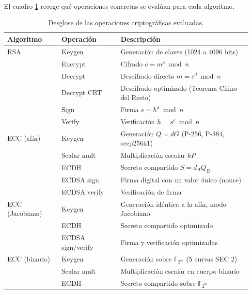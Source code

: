 El cuadro \ref{tab:operaciones} recoge qué operaciones concretas se evalúan para cada algoritmo.

\begin{table}[htbp]
\centering
\small
\begin{tabular}{llp{6.5cm}}
\hline
\textbf{Algoritmo} & \textbf{Operación} & \textbf{Descripción} \\
\hline
RSA              & Keygen           & Generación de claves (1024 a 4096 bits) \\
                 & Encrypt          & Cifrado $c = m^e \bmod n$ \\
                 & Decrypt          & Descifrado directo $m = c^d \bmod n$ \\
                 & Decrypt CRT      & Descifrado optimizado (Teorema Chino del Resto) \\
                 & Sign             & Firma $s = h^d \bmod n$ \\
                 & Verify           & Verificación $h = s^e \bmod n$ \\
\hline
ECC (afín)       & Keygen           & Generación $Q = dG$ (P-256, P-384, secp256k1) \\
                 & Scalar mult      & Multiplicación escalar $kP$ \\
                 & ECDH             & Secreto compartido $S = d_A Q_B$ \\
                 & ECDSA sign       & Firma digital con un valor único (nonce) \\
                 & ECDSA verify     & Verificación de firma \\
\hline
ECC (Jacobiano)  & Keygen           & Generación idéntica a la afín, modo Jacobiano \\
                 & ECDH             & Secreto compartido optimizado \\
                 & ECDSA sign/verify & Firma y verificación optimizadas \\
\hline
ECC (binario)    & Keygen           & Generación sobre $\mathbb{F}_{2^m}$ (5 curvas SEC 2) \\
                 & Scalar mult      & Multiplicación escalar en cuerpo binario \\
                 & ECDH             & Secreto compartido sobre $\mathbb{F}_{2^m}$ \\
\hline
\end{tabular}
\caption{Desglose de las operaciones criptográficas evaluadas.}
\label{tab:operaciones}
\end{table}

